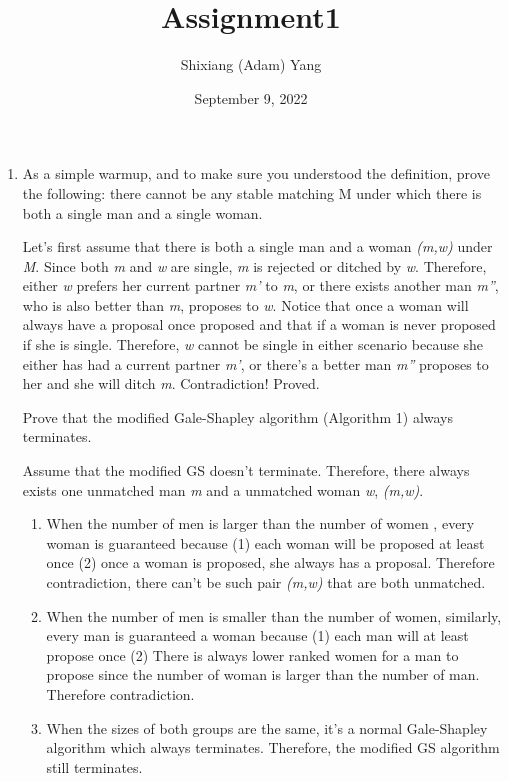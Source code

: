 \documentclass{homework}
\author{Shixiang (Adam) Yang}
\date{September 9, 2022}
\title{Assignment1}
\begin{document}
 \maketitle

\begin{enumerate}
    \item
    \question  As a simple warmup, and to make sure you understood the definition, prove the following: there cannot be any stable matching M under which there is both a single man and a single woman.

    Let's first assume that there is both a single man and a woman \textit{(m,w)} under \textit{M}. Since both \textit{m} and \textit{w} are single, \textit{m} is rejected or ditched by \textit{w}. Therefore, either \textit{w} prefers her current partner \textit{m'} to \textit{m}, or there exists another man \textit{m''}, who is also better than \textit{m}, proposes to \textit{w}. Notice that once a woman will always have a proposal once proposed and that if a woman is never proposed if she is single. Therefore, \textit{w} cannot be single in either scenario because she either has had a current partner \textit{m'}, or there's a better man \textit{m''} proposes to her and she will ditch \textit{m}. Contradiction! Proved.
    
    \question  Prove that the modified Gale-Shapley algorithm (Algorithm 1) always terminates.
    
    Assume that the modified GS doesn't terminate. Therefore, there always exists one unmatched man \textit{m} and a unmatched woman \textit{w}, \textit{(m,w)}. 
    \begin{enumerate}
        \item When the number of men is larger than the number of women , every woman is guaranteed because (1) each woman will be proposed at least once (2) once a woman is proposed, she always has a proposal. Therefore contradiction, there can't be such pair \textit{(m,w)} that are both unmatched.
        \item When the number of men  is smaller than the number of women, similarly, every man is guaranteed a woman because (1) each man will at least propose once (2) There is always lower ranked women for a man to propose since the number of woman is larger than the number of man. Therefore contradiction.
        \item When the sizes of both groups are the same, it's a normal Gale-Shapley algorithm which always terminates. Therefore, the modified GS algorithm still terminates.
    \end{enumerate}


\end{enumerate}
\end{document}
